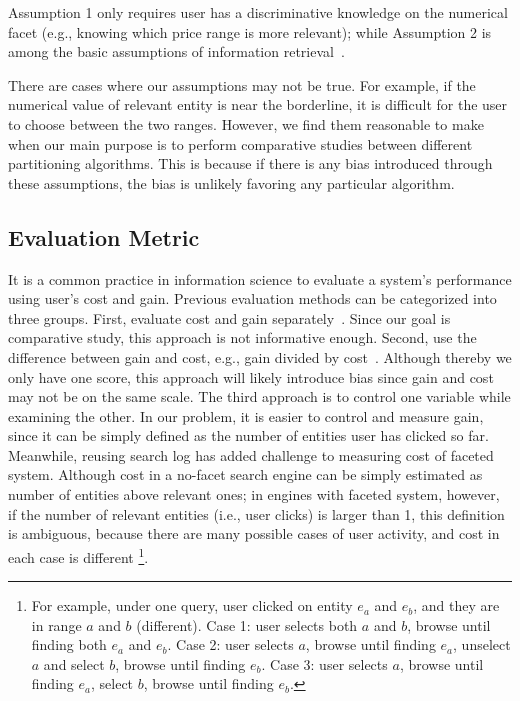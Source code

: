 Assumption 1 only requires user has a discriminative knowledge on the numerical facet (e.g., knowing which price range is more relevant); while Assumption 2 is among the basic assumptions of information retrieval~\cite{Craswell:2008:ECC:1341531.1341545,robertson-the-1997}. 

There are cases where our assumptions may not be true. For example, if the numerical value of relevant entity is near the borderline, it is difficult for the user to choose between the two ranges. However, we find them reasonable to make when our main purpose is to perform comparative studies between different partitioning algorithms. This is because if there is any bias introduced through these assumptions, the bias is unlikely favoring any particular algorithm. 


\subsection{Evaluation Metric}
\label{ch2:metric}

\newcommand\rrank{\mathop{\mbox{$Refined$-$Rank$}}}
It is a common practice in information science to evaluate a system's performance using user's cost and gain. Previous evaluation methods can be categorized into three groups. First, evaluate cost and gain separately~\cite{conf/cikm/YilmazVCRB14}. Since our goal is comparative study, this approach is not informative enough. Second, use the difference between gain and cost, e.g., gain divided by cost~\cite{card:1999}. Although thereby we only have one score, this approach will likely introduce bias since gain and cost may not be on the same scale. The third approach is to control one variable while examining the other. In our problem, it is easier to control and measure gain, since it can be simply defined as the number of entities user has clicked so far. Meanwhile, reusing search log has added challenge to measuring cost of faceted system. Although cost in a no-facet search engine can be simply estimated as number of entities above relevant ones; in engines with faceted system, however, if the number of relevant entities (i.e., user clicks) is larger than 1, this definition is ambiguous, because there are many possible cases of user activity, and cost in each case is different \footnote{For example, under one query, user clicked on entity $e_a$ and $e_b$, and they are in range $a$ and $b$ (different). Case 1: user selects both $a$ and $b$,  browse until finding both $e_a$ and $e_b$. Case 2: user selects $a$, browse until finding $e_a$, unselect $a$ and select $b$, browse until finding $e_b$. Case 3: user selects $a$, browse until finding $e_a$, select $b$, browse until finding $e_b$. }.

